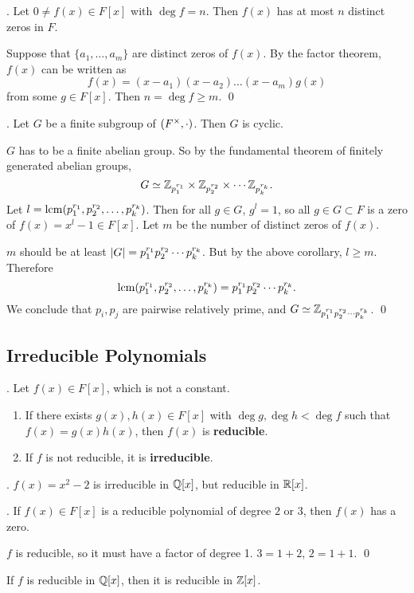 \cor. Let \(0 \neq f(x) \in F[x]\) with \(\deg f = n\). Then \(f(x)\) has at most \(n\) distinct zeros in \(F\).

\pf Suppose that \(\{a_1, \dots, a_m\}\) are distinct zeros of \(f(x)\). By the factor theorem, \(f(x)\) can be written as
\[
    f(x) = (x - a_1)(x - a_2) \dots (x-a_m)g(x)
\]
from some \(g \in F[x]\). Then \(n = \deg f \geq m\). \qed

\cor. Let \(G\) be a finite subgroup of \((F^\times, \cdot)\). Then \(G\) is cyclic.

\pf \(G\) has to be a finite abelian group. So by the fundamental theorem of finitely generated abelian groups,
\[
    G \simeq \mathbb{Z}_{p_1^{r_1}} \times \mathbb{Z}_{p_2^{r_2}} \times \cdots \mathbb{Z}_{p_k^{r_k}}.
\]
Let \(l = {\rm lcm} (p_1^{r_1}, p_2^{r_2}, \dots, p_k^{r_k})\). Then for all \(g \in G\), \(g^l = 1\), so all \(g \in G \subset F\) is a zero of \(f(x) = x^l - 1 \in F[x]\). Let \(m\) be the number of distinct zeros of \(f(x)\).

\(m\) should be at least \(\left| G \right| = p_1^{r_1}p_2^{r_2}\cdots p_k^{r_k}\). But by the above corollary, \(l \geq m\). Therefore
\[
    {\rm lcm} (p_1^{r_1}, p_2^{r_2}, \dots, p_k^{r_k}) = p_1^{r_1}p_2^{r_2}\cdots p_k^{r_k}.
\]
We conclude that \(p_i, p_j\) are pairwise relatively prime, and \(G \simeq \mathbb{Z}_{p_1^{r_1}p_2^{r_2}\cdots p_k^{r_k}}\). \qed

\subsection*{Irreducible Polynomials}

.  Let \(f(x) \in F[x]\), which is not a constant.
\begin{enumerate}
    \item If there exists \(g(x), h(x) \in F[x]\) with \(\deg g, \deg h < \deg f\) such that \(f(x) = g(x)h(x)\), then \(f(x)\) is \textbf{reducible}.
    \item If \(f\) is not reducible, it is \textbf{irreducible}.
\end{enumerate}

\ex. \(f(x) = x^2 - 2\) is irreducible in \(\mathbb{Q}[x]\), but reducible in \(\mathbb{R}[x]\).

\thm. If \(f(x) \in F[x]\) is a reducible polynomial of degree \(2\) or \(3\), then \(f(x)\) has a zero.

\pf \(f\) is reducible, so it must have a factor of degree 1. \(3 = 1 + 2\), \(2 = 1 + 1\). \qed

If \(f\) is reducible in \(\mathbb{Q}[x]\), then it is reducible in \(\mathbb{Z}[x]\).

